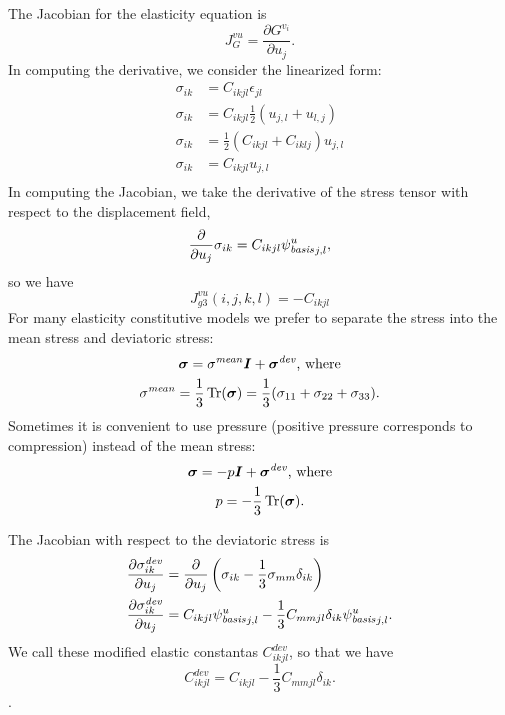 The Jacobian for the elasticity equation is
\begin{equation}
J_{G}^{vu} = \frac{\partial G^{v_i}}{\partial u_j}.
\end{equation}
In computing the derivative, we consider the linearized form:
\begin{align}
  \sigma_{ik} &= C_{ikjl} \epsilon_{jl} \\
  \sigma_{ik} &= C_{ikjl} \frac{1}{2} ( u_{j,l} + u_{l,j} ) \\
  \sigma_{ik} &= \frac{1}{2} ( C_{ikjl} + C_{iklj} ) u_{j,l} \\
  \sigma_{ik} &= C_{ikjl} u_{j,l} \\
\end{align}
In computing the Jacobian, we take the derivative of the stress tensor with respect to the 
displacement field,
\begin{equation}
  \frac{\partial}{\partial u_j} \sigma_{ik} = C_{ikjl} \basisscalar[u]_{j,l},
\end{equation}
so we have
\begin{equation}
\boxed{
  J_{g3}^{vu}(i,j,k,l) = -C_{ikjl}
}
\end{equation}
For many elasticity constitutive models we prefer to separate the
stress into the mean stress and deviatoric stress:
\begin{gather}
  \tensor{\sigma} = \sigma^\mathit{mean} \tensor{I} + \tensor{\sigma}^\mathit{dev} \text{, 
where}\\
  \sigma^\mathit{mean} = \frac{1}{3} \Tr(\tensor{\sigma}) = \frac{1}{3} (\sigma_{11} + 
\sigma_{22} + \sigma_{33}).
\end{gather}
Sometimes it is convenient to use pressure (positive pressure corresponds to compression) 
instead of the mean 
stress:
\begin{gather}
  \tensor{\sigma} = -p \tensor{I} + \tensor{\sigma}^\mathit{dev} \text{, where}\\
  p = -\frac{1}{3} \Tr(\tensor{\sigma}).
\end{gather}

The Jacobian with respect to the deviatoric stress is
\begin{align}
  \frac{\partial \sigma^\mathit{dev}_{ik}}{\partial u_j}  &= \frac{\partial}{\partial u_j} 
\left(\sigma_{ik} - 
\frac{1}{3} \sigma_{mm} \delta_{ik} \right) \\
  \frac{\partial \sigma^\mathit{dev}_{ik}}{\partial u_j}  &= C_{ikjl} \basisscalar[u]_{j,l} - 
\frac{1}{3} C_{mmjl} 
\delta_{ik} \basisscalar[u]_{j,l}.
\end{align}
We call these modified elastic constantas $C^\mathit{dev}_{ikjl}$, so that we have
\begin{equation}
\boxed{
  C^\mathit{dev}_{ikjl} = C_{ikjl} - \frac{1}{3} C_{mmjl} \delta_{ik}.
}
\end{equation}.

